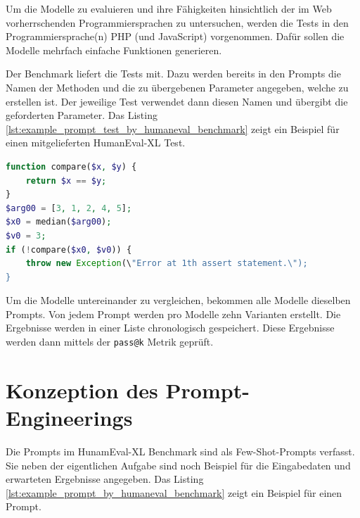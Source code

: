 Um die Modelle zu evaluieren und ihre Fähigkeiten hinsichtlich der im Web vorherrschenden Programmiersprachen zu untersuchen, werden die Tests in den Programmiersprache(n) PHP (und JavaScript) vorgenommen. Dafür sollen die Modelle mehrfach einfache Funktionen generieren.\vspace{0.2cm}

Der Benchmark liefert die Tests mit. Dazu werden bereits in den Prompts die Namen der Methoden und die zu übergebenen Parameter angegeben, welche zu erstellen ist. Der jeweilige Test verwendet dann diesen Namen und übergibt die geforderten Parameter. Das Listing \ref{lst:example_prompt_test_by_humaneval_benchmark} zeigt ein Beispiel für einen mitgelieferten HumanEval-XL Test.

\begin{lstlisting}[language=php,caption={Beispiel für einen Test aus dem HumanEval-XL Benchmark},label=lst:example_prompt_test_by_humaneval_benchmark]
function compare($x, $y) {
	return $x == $y;
}
$arg00 = [3, 1, 2, 4, 5];
$x0 = median($arg00);
$v0 = 3;
if (!compare($x0, $v0)) {
	throw new Exception(\"Error at 1th assert statement.\");
}
\end{lstlisting}


Um die Modelle untereinander zu vergleichen, bekommen alle Modelle dieselben Prompts. Von jedem Prompt werden pro Modelle zehn Varianten erstellt. Die Ergebnisse werden in einer Liste chronologisch gespeichert. Diese Ergebnisse werden dann mittels der \texttt{pass@k} Metrik geprüft.



\section{Konzeption des Prompt-Engineerings}
Die Prompts im HunamEval-XL Benchmark sind als Few-Shot-Prompts verfasst. Sie neben der eigentlichen Aufgabe sind noch Beispiel für die Eingabedaten und erwarteten Ergebnisse angegeben. Das Listing \ref{lst:example_prompt_by_humaneval_benchmark} zeigt ein Beispiel für einen Prompt.


